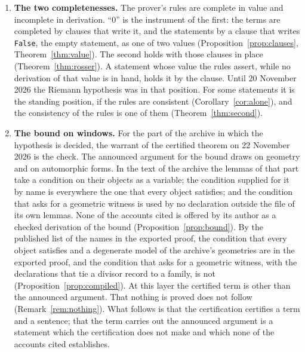 \documentclass[11pt]{article}
\theoremstyle{definition}
\theoremstyle{remark}
\DeclareRobustCommand{\lean}[1]{{\renewcommand{\_}{\textunderscore\allowbreak}\texttt{#1}}}
\newcommand{\False}{\lean{False}}
\begin{document}
\begin{enumerate}[leftmargin=2em,itemsep=4pt]
\item \textbf{The two completenesses.} The prover's rules are complete in value and incomplete in derivation. ``0'' is the instrument of the first: the terms are completed by clauses that write it, and the statements by a clause that writes \False, the empty statement, as one of two values (Proposition~\ref{prop:clauses}, Theorem~\ref{thm:value}). The second holds with those clauses in place (Theorem~\ref{thm:rosser}). A statement whose value the rules assert, while no derivation of that value is in hand, holds it by the clause. Until 20 November 2026 the Riemann hypothesis was in that position. For some statements it is the standing position, if the rules are consistent (Corollary~\ref{cor:alone}), and the consistency of the rules is one of them (Theorem~\ref{thm:second}).

\item \textbf{The bound on windows.} For the part of the archive in which the hypothesis is decided, the warrant of the certified theorem on 22 November 2026 is the check. The announced argument for the bound draws on geometry and on automorphic forms. In the text of the archive the lemmas of that part take a condition on their objects as a variable; the condition supplied for it by name is everywhere the one that every object satisfies; and the condition that asks for a geometric witness is used by no declaration outside the file of its own lemmas. None of the accounts cited is offered by its author as a checked derivation of the bound (Proposition~\ref{prop:bound}). By the published list of the names in the exported proof, the condition that every object satisfies and a degenerate model of the archive's geometries are in the exported proof, and the condition that asks for a geometric witness, with the declarations that tie a divisor record to a family, is not (Proposition~\ref{prop:compiled}). At this layer the certified term is other than the announced argument. That nothing is proved does not follow (Remark~\ref{rem:nothing}). What follows is that the certification certifies a term and a sentence; that the term carries out the announced argument is a statement which the certification does not make and which none of the accounts cited establishes.


\end{enumerate}
\end{document}
